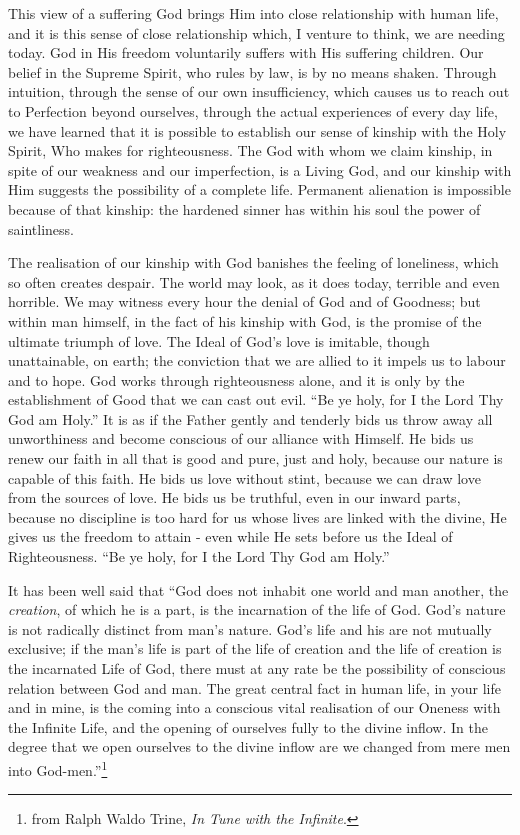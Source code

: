 This view of a suffering God brings Him into close
relationship with human life, and it is this sense of close
relationship which, I venture to think, we are needing
today. God in His freedom voluntarily suffers with His
suffering children. Our belief in the Supreme Spirit, who
rules by law, is by no means shaken. Through intuition,
through the sense of our own insufficiency, which causes us
to reach out to Perfection beyond ourselves, through the
actual experiences of every day life, we have learned that
it is possible to establish our sense of kinship with the
Holy Spirit, Who makes for righteousness. The God with
whom we claim kinship, in spite of our weakness and our
imperfection, is a Living God, and our kinship with Him
suggests the possibility of a complete life. Permanent
alienation is impossible because of that kinship: the
hardened sinner has within his soul the power of saintliness.

The realisation of our kinship with God banishes the
feeling of loneliness, which so often creates despair. The
world may look, as it does today, terrible and even
horrible. We may witness every hour the denial of God and
of Goodness; but within man himself, in the fact of his
kinship with God, is the promise of the ultimate triumph of
love. The Ideal of God's love is imitable, though unattainable,
on earth; the conviction that we are allied to it
impels us to labour and to hope. God works through
righteousness alone, and it is only by the establishment of
Good that we can cast out evil. ``Be ye holy, for I the
Lord Thy God am Holy.'' It is as if the Father gently and
tenderly bids us throw away all unworthiness and become
conscious of our alliance with Himself. He bids us renew
our faith in all that is good and pure, just and holy,
because our nature is capable of this faith. He bids us
love without stint, because we can draw love from the
sources of love. He bids us be truthful, even in our
inward parts, because no discipline is too hard for us
whose lives are linked with the divine, He gives us the
freedom to attain - even while He sets before us the Ideal
of Righteousness. ``Be ye holy, for I the Lord Thy God am
Holy.''

It has been well said that ``God does not inhabit one
world and man another, the \textsl{creation}, of which he is a part,
is the incarnation of the life of God. God's nature is not
radically distinct from man's nature. God’s life and his
are not mutually exclusive; if the man's life is part of
the life of creation and the life of creation is the incarnated
Life of God, there must at any rate be the
possibility of conscious relation between God and man. The
great central fact in human life, in your life and in mine,
is the coming into a conscious vital realisation of our
Oneness with the Infinite Life, and the opening of ourselves
fully to the divine inflow. In the degree that we open
ourselves to the divine inflow are we changed from mere men
into God-men.''\footnote{from Ralph Waldo Trine, \textsl{In Tune with the Infinite}.}

